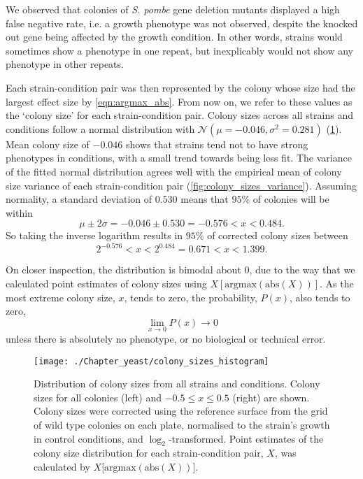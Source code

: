 We observed that colonies of \emph{S. pombe} gene deletion mutants displayed a high false negative rate, i.e. a growth phenotype was not observed, despite the knocked out gene being affected by the growth condition.
In other words, strains would sometimes show a phenotype in one repeat, but inexplicably would not show any phenotype in other repeats.

Each strain-condition pair was then represented by the colony whose size had the largest effect size by \eqref{eqn:argmax_abs}. From now on, we refer to these values as the `colony size' for each strain-condition pair. Colony sizes across all strains and conditions follow a normal distribution with $\mathcal{N}(\mu = -0.046, \sigma^2=0.281)$ (\ref{fig:colony-sizes}). Mean colony size of $-0.046$ shows that strains tend not to have strong phenotypes in conditions, with a small trend towards being less fit. The variance of the fitted normal distribution agrees well with the empirical mean of colony size variance of each strain-condition pair (\ref{fig:colony_sizes_variance}).
Assuming normality, a standard deviation of $0.530$ means that $95\%$ of colonies will be within
\[
    \mu \pm 2\sigma = -0.046\pm 0.530 = -0.576 < x < 0.484.
\]
So taking the inverse logarithm results in $95\%$ of corrected colony sizes between
\[
    2^{-0.576}<x<2^{0.484} = 0.671<x<1.399.
\]

On closer inspection, the distribution is bimodal about $0$, due to the way that we calculated point estimates of colony sizes using $X[\text{argmax}(\text{abs}(X))]$. As the most extreme colony size, $x$, tends to zero, the probability, $P(x)$, also tends to zero,
\[
    \lim_{x \to 0} P(x) \to 0
\]
unless there is absolutely no phenotype, or no biological or technical error.

\begin{figure}[!hbt]
    \centering
    \texttt{[image: ./Chapter\_yeast/colony\_sizes\_histogram]}
    \caption{%
        Distribution of colony sizes from all strains and conditions.
        Colony sizes for all colonies (left) and $-0.5 \le x \le 0.5$ (right) are shown.
        Colony sizes were corrected using the reference surface from the grid of wild type colonies on each plate, normalised to the strain's growth in control conditions, and $\log_2$-transformed.
        Point estimates of the colony size distribution for each strain-condition pair, $X$, was calculated by $X \lbrack \text{argmax}(\text{abs}(X)) \rbrack$.
    }
    \label{fig:colony-sizes}
\end{figure}


